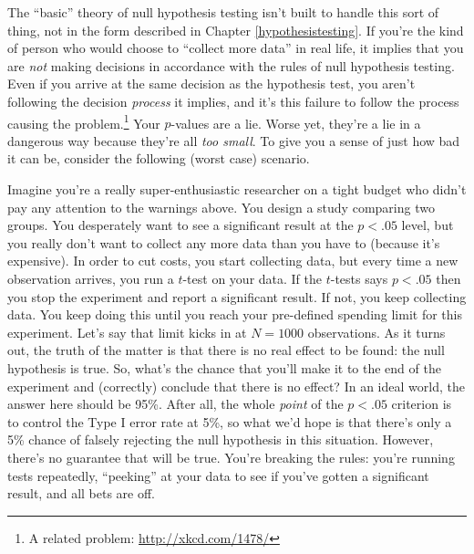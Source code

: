 \documentclass[
]{book}
\theoremstyle{definition}
\theoremstyle{definition}
\theoremstyle{definition}
\theoremstyle{definition}
\theoremstyle{remark}
\begin{document}
The ``basic'' theory of null hypothesis testing isn't built to handle this sort of thing, not in the form described in Chapter \ref{hypothesistesting}. If you're the kind of person who would choose to ``collect more data'' in real life, it implies that you are \emph{not} making decisions in accordance with the rules of null hypothesis testing. Even if you arrive at the same decision as the hypothesis test, you aren't following the decision \emph{process} it implies, and it's this failure to follow the process causing the problem.\footnote{A related problem: \url{http://xkcd.com/1478/}} Your \(p\)-values are a lie. Worse yet, they're a lie in a dangerous way because they're all \emph{too small}. To give you a sense of just how bad it can be, consider the following (worst case) scenario.

Imagine you're a really super-enthusiastic researcher on a tight budget who didn't pay any attention to the warnings above. You design a study comparing two groups. You desperately want to see a significant result at the \(p<.05\) level, but you really don't want to collect any more data than you have to (because it's expensive). In order to cut costs, you start collecting data, but every time a new observation arrives, you run a \(t\)-test on your data. If the \(t\)-tests says \(p<.05\) then you stop the experiment and report a significant result. If not, you keep collecting data. You keep doing this until you reach your pre-defined spending limit for this experiment. Let's say that limit kicks in at \(N=1000\) observations. As it turns out, the truth of the matter is that there is no real effect to be found: the null hypothesis is true. So, what's the chance that you'll make it to the end of the experiment and (correctly) conclude that there is no effect? In an ideal world, the answer here should be 95\%. After all, the whole \emph{point} of the \(p<.05\) criterion is to control the Type I error rate at 5\%, so what we'd hope is that there's only a 5\% chance of falsely rejecting the null hypothesis in this situation. However, there's no guarantee that will be true. You're breaking the rules: you're running tests repeatedly, ``peeking'' at your data to see if you've gotten a significant result, and all bets are off.
\end{document}
